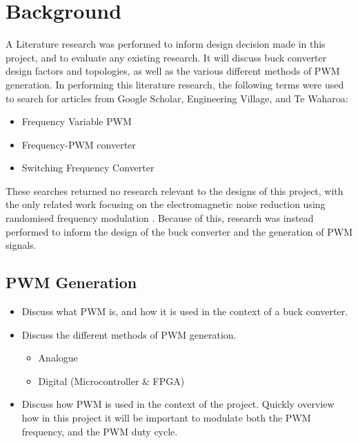 \chapter{Background}\label{C:background}

A Literature research was performed to inform design decision made in this project, and to evaluate any existing research. It will discuss buck converter design factors and topologies, as well as the various different methods of PWM generation. In performing this literature research, the following terms were used to search for articles from Google Scholar, Engineering Village, and Te Waharoa:

\begin{itemize}
    \item Frequency Variable PWM
    \item Frequency-PWM converter
    \item Switching Frequency Converter
\end{itemize}

These searches returned no research relevant to the designs of this project, with the only related work focusing on the electromagnetic noise reduction using randomised frequency modulation \cite{Roman2001,Familiant2016}. Because of this, research was instead performed to inform the design of the buck converter and the generation of PWM signals.

\section{PWM Generation}\label{S:PWM}

\begin{itemize}

    \item
          Discuss what PWM is, and how it is used in the context of a buck converter.

    \item
          Discuss the different methods of PWM generation.

          \begin{itemize}
              \item Analogue
              \item Digital (Microcontroller \& FPGA)
          \end{itemize}

    \item
          Discuss how PWM is used in the context of the project. Quickly overview how in this project it will be important to modulate both the PWM frequency, and the PWM duty cycle.

\end{itemize}



